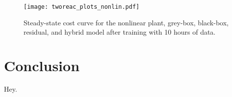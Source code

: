 \documentclass{article}
\begin{document}
\begin{figure}[!h]
  \centering
  \texttt{[image: tworeac\_plots\_nonlin.pdf]}
  \caption{Steady-state cost curve for the nonlinear plant, grey-box, black-box,
  residual, and hybrid model after training with 10 hours of data.}
  \label{fig:cost_nonlinear_10hours}
\end{figure}

\section{Conclusion}
Hey.
\end{document}

